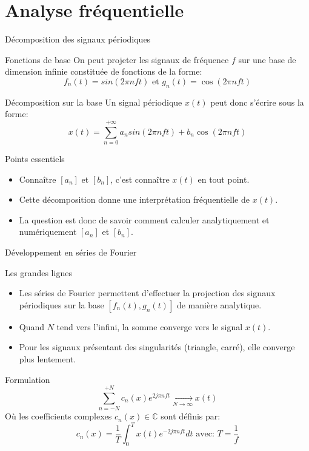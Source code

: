\documentclass[8pt,a4paper]{beamer}
\begin{document}
\section{Analyse fréquentielle}
\begin{frame}{Décomposition des signaux périodiques}
\begin{block}{Fonctions de base}
On peut projeter les signaux de fréquence $f$ sur une base de dimension infinie constituée de fonctions de la forme:
$$
f_n(t)=sin(2\pi n f t)\mbox{ et } g_n(t)=\cos(2\pi n f t)
$$ 
\end{block}
\begin{block}{Décomposition sur la base}
Un signal périodique $x(t)$ peut donc s'écrire sous la forme:
$$
x(t) = \sum\limits_{n=0}^{+\infty} a_n sin(2\pi n f t) + b_n \cos(2\pi n f t)
$$
\end{block}
\begin{alertblock}{Points essentiels}
\begin{itemize}
\item Connaître $[a_n]$ et $[b_n]$, c'est connaître $x(t)$ en tout point.
\item Cette décomposition donne une interprétation fréquentielle de $x(t)$.
\item La question est donc de savoir comment calculer analytiquement et numériquement $[a_n]$ et $[b_n]$.
\end{itemize}
\end{alertblock}

\end{frame}

\begin{frame}{Développement en séries de Fourier}
\begin{block}{Les grandes lignes}
\begin{itemize}
\item Les séries de Fourier permettent d'effectuer la projection des signaux périodiques sur la base $[f_n(t),g_n(t)]$ de manière analytique.
\item Quand $N$ tend vers l'infini, la somme converge vers le signal $x(t)$. 
\item Pour les signaux présentant des singularités (triangle, carré), elle converge plus lentement.
\end{itemize}
\end{block}
\begin{alertblock}{Formulation}
$$
\sum\limits_{n=-N}^{+N}c_n(x)e^{2j\pi n f t} \underset{N\to \infty}{\longrightarrow} x(t)
$$
Où les coefficients complexes $c_n(x)\in \mathbb{C}$ sont définis par:
$$
c_n(x)=\frac{1}{T}\int_{0}^{T}x(t)e^{-2j\pi n f t}dt\mbox{ avec: } T=\frac{1}{f}
$$
\end{alertblock}
\end{frame}
\end{document}
